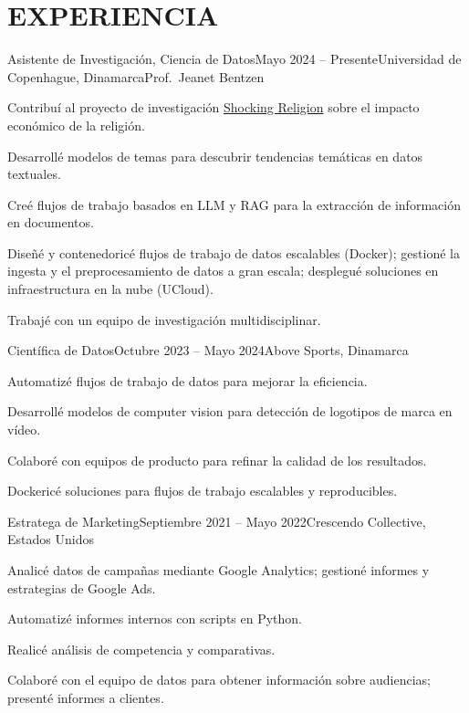 \documentclass{resume}
\begin{document}
\section{EXPERIENCIA}
\begin{content}

    \begin{position}{Asistente de Investigación, Ciencia de Datos}{Mayo 2024 -- Presente}{Universidad de Copenhague, Dinamarca}{Prof.~Jeanet Bentzen}{}
        \item Contribuí al proyecto de investigación {\href{https://www.economics.ku.dk/research/externally-funded-research_new/shocking-religion/}{Shocking Religion}} sobre el impacto económico de la religión.
        \item Desarrollé modelos de temas para descubrir tendencias temáticas en datos textuales.
        \item Creé flujos de trabajo basados en LLM y RAG para la extracción de información en documentos.
        \item Diseñé y contenedoricé flujos de trabajo de datos escalables (Docker); gestioné la ingesta y el preprocesamiento de datos a gran escala; desplegué soluciones en infraestructura en la nube (UCloud).
        \item Trabajé con un equipo de investigación multidisciplinar.
    \end{position}
    
    \begin{position}{Científica de Datos}{Octubre 2023 -- Mayo 2024}{Above Sports, Dinamarca}{}{ }
        \item Automatizé flujos de trabajo de datos para mejorar la eficiencia.
        \item Desarrollé modelos de computer vision para detección de logotipos de marca en vídeo.
        \item Colaboré con equipos de producto para refinar la calidad de los resultados.
        \item Dockericé soluciones para flujos de trabajo escalables y reproducibles.
    \end{position}
    
    \begin{position}{Estratega de Marketing}{Septiembre 2021 -- Mayo 2022}{Crescendo Collective, Estados Unidos}{}{ }
        \item Analicé datos de campañas mediante Google Analytics; gestioné informes y estrategias de Google Ads.
        \item Automatizé informes internos con scripts en Python.
        \item Realicé análisis de competencia y comparativas.
        \item Colaboré con el equipo de datos para obtener información sobre audiencias; presenté informes a clientes.
    \end{position}
    
\end{content}
\end{document}
